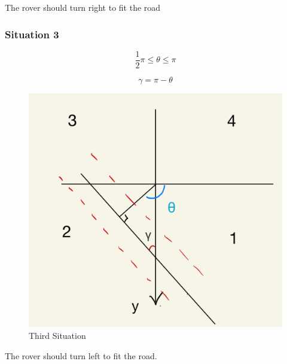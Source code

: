 \documentclass[12pt, a4paper, oneside]{report}
\begin{document}
The rover should turn right to fit the road

\subsubsection{Situation 3}

\begin{tcolorbox}
    $$\frac{1}{2}\pi\leq\theta\leq\pi$$
    
    $$\gamma=\pi-\theta$$
\end{tcolorbox}

\begin{figure}[H]
    \centering
    \includegraphics[scale=0.15]{pic/angle/3.png}
    \caption{Third Situation}
    \label{thirs}
\end{figure}

The rover should turn left to fit the road.
\end{document}
